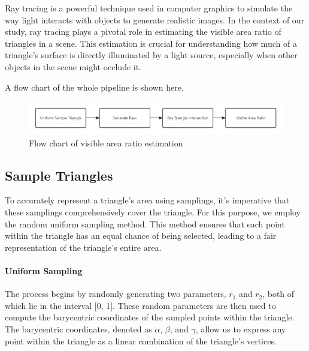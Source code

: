 \documentclass[11pt, a4paper,oneside,chapterprefix=false]{scrbook}
\begin{document}
Ray tracing is a powerful technique used in computer graphics to simulate the way light interacts with objects to generate realistic images. In the context of our study, ray tracing plays a pivotal role in estimating the visible area ratio of triangles in a scene. This estimation is crucial for understanding how much of a triangle's surface is directly illuminated by a light source, especially when other objects in the scene might occlude it.

\vspace{10pt}

A flow chart of the whole pipeline is shown here.

\begin{minipage}{\textwidth}
	\begin{figure}[H]
		\centering
		\includegraphics*[width=1.0\textwidth]{figures/visible area.png}
		\caption{Flow chart of visible area ratio estimation}
		\label{fig:visible area ratio estimation}
	\end{figure}
\end{minipage}

\subsection{Sample Triangles}

To accurately represent a triangle's area using samplings, it's imperative that these samplings comprehensively cover the triangle. For this purpose, we employ the random uniform sampling method. This method ensures that each point within the triangle has an equal chance of being selected, leading to a fair representation of the triangle's entire area.

\paragraph{Uniform Sampling}

The process begins by randomly generating two parameters, \( r_1 \) and \( r_2 \), both of which lie in the interval [0, 1]. These random parameters are then used to compute the barycentric coordinates of the sampled points within the triangle. The barycentric coordinates, denoted as \( \alpha \), \( \beta \), and \( \gamma \), allow us to express any point within the triangle as a linear combination of the triangle's vertices.
\end{document}
